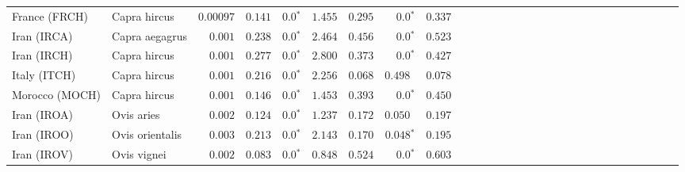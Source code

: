 \begin{center}
\begin{adjustbox}{width = 1\textwidth}
\begin{tabular}{|l|l|r|r|r|r|r|r|r|r|r|r|r|r|r|r|r|r|r|r|r|r|r|r|r|r|r|r|r|}
                  France (FRCH) &         Capra hircus &          $0.00097$ &                      $ 0.141$ &                  $\bm{0.0{^*}}$ &                                           $ 1.455$ &                      $ 0.295$ &                  $\bm{0.0{^*}}$ &                                           $ 0.337$ \\
                    Iran (IRCA) &       Capra aegagrus &           $ 0.001$ &                      $ 0.238$ &                  $\bm{0.0{^*}}$ &                                           $ 2.464$ &                      $ 0.456$ &                  $\bm{0.0{^*}}$ &                                           $ 0.523$ \\
                    Iran (IRCH) &         Capra hircus &           $ 0.001$ &                      $ 0.277$ &                  $\bm{0.0{^*}}$ &                                           $ 2.800$ &                      $ 0.373$ &                  $\bm{0.0{^*}}$ &                                           $ 0.427$ \\
                   Italy (ITCH) &         Capra hircus &           $ 0.001$ &                      $ 0.216$ &                  $\bm{0.0{^*}}$ &                                           $ 2.256$ &                      $ 0.068$ &                      $ 0.498~~$ &                                           $ 0.078$ \\
                 Morocco (MOCH) &         Capra hircus &           $ 0.001$ &                      $ 0.146$ &                  $\bm{0.0{^*}}$ &                                           $ 1.453$ &                      $ 0.393$ &                  $\bm{0.0{^*}}$ &                                           $ 0.450$ \\
                    Iran (IROA) &           Ovis aries &           $ 0.002$ &                      $ 0.124$ &                  $\bm{0.0{^*}}$ &                                           $ 1.237$ &                      $ 0.172$ &                      $ 0.050~~$ &                                           $ 0.197$ \\
                    Iran (IROO) &      Ovis orientalis &           $ 0.003$ &                      $ 0.213$ &                  $\bm{0.0{^*}}$ &                                           $ 2.143$ &                      $ 0.170$ &               $\bm{ 0.048{^*}}$ &                                           $ 0.195$ \\
                    Iran (IROV) &          Ovis vignei &           $ 0.002$ &                      $ 0.083$ &                  $\bm{0.0{^*}}$ &                                           $ 0.848$ &                      $ 0.524$ &                  $\bm{0.0{^*}}$ &                                           $ 0.603$ \\

\end{tabular}
\end{adjustbox}
\end{center}
